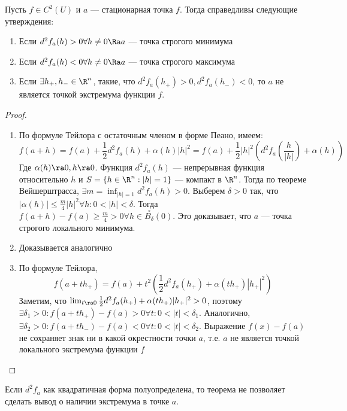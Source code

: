 \begin{theorem}
    Пусть \(f \in C^2(U)\) и \(a\) --- стационарная точка \(f\). Тогда справедливы следующие утверждения:
    \begin{enumerate}
        \item Если \(d^2f_a(h) > 0 \forall h \ne 0 \Ra a\) --- точка строгого минимума
        \item Если \(d^2f_a(h) < 0 \forall h \ne 0 \Ra a\) --- точка строгого максимума
        \item Если \(\exists h_+, h_- \in \R^n\), такие, что \(d^2f_a(h_+) > 0, d^2f_a(h_-) < 0\), то \(a\) не является точкой экстремума функции \(f\).
    \end{enumerate}
\end{theorem}
\begin{proof}\indent
    \begin{enumerate}
        \item По формуле Тейлора с остаточным членом в форме Пеано, имеем:
        \[f(a + h) = f(a) + \frac{1}{2}d^2f_a(h) + \alpha(h)|h|^2 = f(a) + \frac{1}{2}|h|^2\left( d^2f_a\left( \frac{h}{|h|} \right) + \alpha(h)\right)\]
        Где \(\alpha(h) \ra 0, h \ra 0\). Функция \(d^2f_a\left( h \right)\) --- непрерывная функция относительно \(h\) и \(S = \{h \in \R^n: |h| = 1\}\) --- компакт в \(\R^n\). Тогда по теореме Вейшерштрасса, \(\exists m = \inf_{|h| = 1} d^2f_a(h) > 0\). Выберем \(\delta > 0\) так, что \(|\alpha(h)| \le \frac{m}{4}|h|^2 \forall h: 0 < |h| < \delta\). Тогда \(f(a + h) - f(a) \ge \frac{m}{4} > 0 \forall h \in \stackrel{\circ}{B_{\delta}}(0)\). Это доказывает, что \(a\) --- точка строгого локального минимума.

        \item Доказывается аналогично
        \item По формуле Тейлора, 
        \[f(a + th_+) = f(a) + t^2\left( \frac{1}{2}d^2f_a(h_+) + \alpha(th_+)|h_+|^2 \right)\]
        Заметим, что \(\lim_{t \ra 0} \frac{1}{2}d^2f_a(h_+) + \alpha(th_+)|h_+|^2 > 0\), поэтому \(\exists \delta_1 > 0: f(a + th_+) - f(a) > 0 \forall t: 0 < |t| < \delta_1 \). Аналогично, \(\exists \delta_2 > 0: f(a + th_-) - f(a) < 0 \forall t: 0 < |t| < \delta_2 \). Выражение \(f(x) - f(a)\) не сохраняет знак ни в какой окрестности точки \(a\), т.е. \(a\) не является точкой локального экстремума функции \(f\)
    \end{enumerate}
\end{proof}

\begin{note}
    Если \(d^2f_a\) как квадратичная форма полуопределена, то теорема не позволяет сделать вывод о наличии экстремума в точке \(a\).
\end{note}

